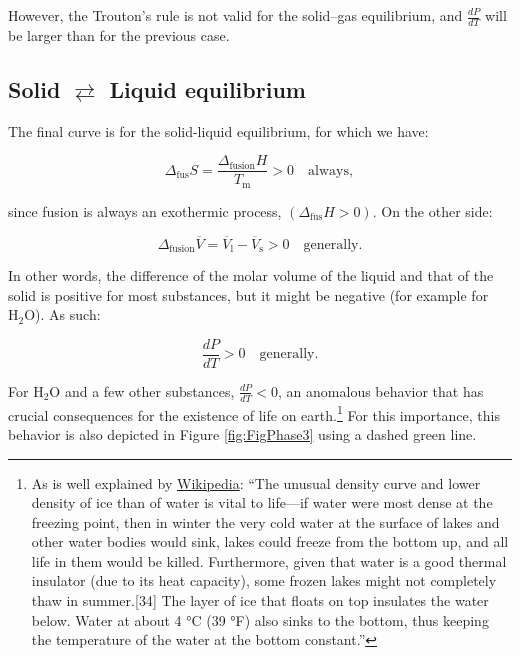 \documentclass[
  9pt,
]{extbook}
\theoremstyle{definition}
\theoremstyle{definition}
\theoremstyle{definition}
\theoremstyle{definition}
\theoremstyle{remark}
\begin{document}
However, the Trouton's rule is not valid for the solid--gas equilibrium, and \(\frac{dP}{dT}\) will be larger than for the previous case.

\subsection{\texorpdfstring{Solid \(\rightleftarrows\) Liquid equilibrium}{Solid \textbackslash rightleftarrows Liquid equilibrium}}\label{solid-rightleftarrows-liquid-equilibrium}

The final curve is for the solid-liquid equilibrium, for which we have:

\begin{equation}
\Delta_{\text{fus}} S = \frac{\Delta_{\text{fusion}} H}{T_{\text{m}}} > 0 \quad \text{always},
\label{eq:PTd1}
\end{equation}

since fusion is always an exothermic process, \((\Delta_{\text{fus}} H>0)\). On the other side:

\begin{equation}
\Delta_{\text{fusion}} \overline{V} = \overline{V}_{\text{l}} - \overline{V}_{\text{s}} > 0 \quad \text{generally}.
\end{equation}

In other words, the difference of the molar volume of the liquid and that of the solid is positive for most substances, but it might be negative (for example for \(\mathrm{H}_2\mathrm{O}\)). As such:

\begin{equation}
 \frac{dP}{dT} > 0 \quad \text{generally}.
\label{eq:PTd2}
\end{equation}

For \(\mathrm{H}_2\mathrm{O}\) and a few other substances, \(\frac{dP}{dT}<0\), an anomalous behavior that has crucial consequences for the existence of life on earth.\footnote{As is well explained by \href{https://en.wikipedia.org/wiki/Properties_of_water\#Density_of_water_and_ice}{Wikipedia}: ``The unusual density curve and lower density of ice than of water is vital to life---if water were most dense at the freezing point, then in winter the very cold water at the surface of lakes and other water bodies would sink, lakes could freeze from the bottom up, and all life in them would be killed. Furthermore, given that water is a good thermal insulator (due to its heat capacity), some frozen lakes might not completely thaw in summer.{[}34{]} The layer of ice that floats on top insulates the water below. Water at about 4 °C (39 °F) also sinks to the bottom, thus keeping the temperature of the water at the bottom constant.''} For this importance, this behavior is also depicted in Figure \ref{fig:FigPhase3} using a dashed green line.
\end{document}
